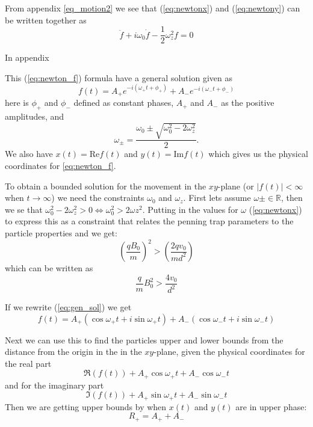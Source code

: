 \documentclass[english,notitlepage,reprint,nofootinbib]{revtex4-1}  %
\begin{document}
	From appendix \ref{eq_motion2} we see that (\ref{eq:newtonx}) and (\ref{eq:newtony}) can be written together as 
	\begin{equation} \label{eq:newton_f}
		\ddot{f} + i \omega_0 \dot{f} - \frac{1}{2} \omega_z^2 f = 0
	\end{equation}

	In appendix 


	This (\ref{eq:newton_f}) formula have a general solution given as
	\begin{equation} \label{eq:gen_sol}
		f(t) = A_+ e^{-i(\omega_+ t + \phi_+)} + A_- e^{-i(\omega_- t + \phi_-)}
	\end{equation}
	here is $\phi_+$ and $\phi_-$ defined as constant phases, $A_+$ and $A_-$ as the positive amplitudes, and 
	\begin{equation*}
		\omega_\pm = \frac{\omega_0 \pm \sqrt{\omega_0^2 - 2\omega_z^2}}{2}.
	\end{equation*}
	We also have $x(t) = \text{Re} f(t)$ and $y(t) = \text{Im} f(t)$ which gives us the physical coordinates for \ref{eq:newton_f}.
	
	To obtain a bounded solution for the movement in the $xy$-plane (or $|f(t)| < \infty$ when $t\to\infty$) we need the constraints $\omega_0$ and $\omega_z$. First lets assume $\omega \pm \in \mathbb{R}$, then we se that
	$\omega_0^2 - 2 \omega_z^2 > 0 \Leftrightarrow \omega_0^2 > 2 \omega z^2$.
	Putting in the values for $\omega$ (\ref{eq:newtonx}) to express this as a constraint that relates the penning trap parameters to the particle properties and we get:
	\begin{equation*}
		\left( \frac{q B_0}{m} \right) ^2 > \left( \frac{2 q v_0}{m d^2} \right)
	\end{equation*}
	which can be written as
	\begin{equation*}
		\frac{q}{m} B_0^2 > \frac{4 v_0}{d^2} 
	\end{equation*}

    If we rewrite (\ref{eq:gen_sol}) we get
    \begin{equation*}
        f(t) = A_+ (\cos \omega_+ t + i \sin \omega_+ t) + A_- (\cos \omega_- t + i \sin \omega_- t)
    \end{equation*}

    Next we can use this to find the particles upper and lower bounds from the distance from the origin in the in the $xy$-plane, given the physical coordinates for the real part
	\begin{equation*} 
		\Re \left( f(t) \right) + A_+ \cos \omega_+ t + A_- \cos \omega_- t
	\end{equation*}
	and for the imaginary part
	\begin{equation*}
		\Im \left( f(t) \right) + A_+ \sin \omega_+ t + A_- \sin \omega_- t
	\end{equation*}
	Then we are getting upper bounds by when $x(t)$ and $y(t)$ are in upper phase:
	\begin{equation*}
		R_+ = A_+ + A_-
	\end{equation*}
\end{document}
